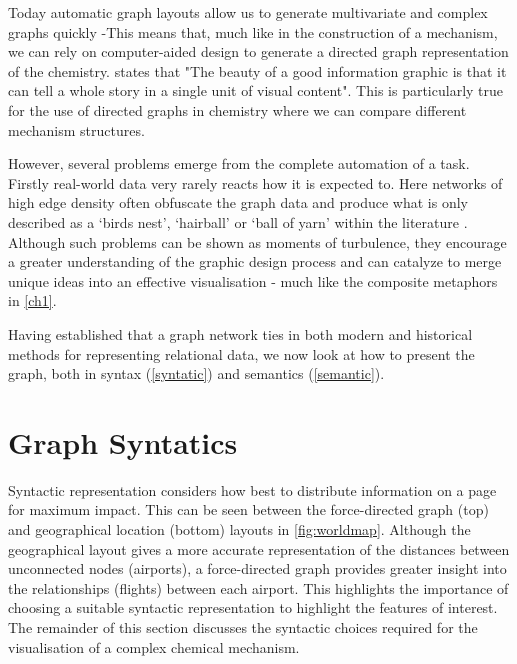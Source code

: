 Today automatic graph layouts allow us to generate multivariate and complex graphs quickly \citep{ch3} -This means that, much like in the construction of a mechanism, we can rely on computer-aided design to generate a directed graph representation of the chemistry. \cite{sciamerican} states that "The beauty of a good information graphic is that it can tell a whole story in a single unit of visual content". This is particularly true for the use of directed graphs in chemistry where we can compare different mechanism structures.

However, several problems emerge from the complete automation of a task. Firstly real-world data very rarely reacts how it is expected to. Here networks of high edge density often obfuscate the graph data and produce what is only described as a `birds nest', `hairball' or `ball of yarn' within the literature \citep{ch7}. Although such problems can be shown as moments of turbulence, they encourage a greater understanding of the graphic design process and can catalyze to merge unique ideas into an effective visualisation \citep{goodideas} - much like the composite metaphors in \autoref{ch1}.


Having established that a graph network ties in both modern and historical methods for representing relational data, we now look at how to present the graph, both in syntax (\autoref{syntatic}) and semantics (\autoref{semantic}).



\section{Graph Syntatics}\label{syntatic}

 Syntactic representation considers how best to distribute information on a page for maximum impact. This can be seen between the force-directed graph (top) and geographical location (bottom) layouts in \autoref{fig:worldmap}. Although the geographical layout gives a more accurate representation of the distances between unconnected nodes (airports), a force-directed graph provides greater insight into the relationships (flights) between each airport. This highlights the importance of choosing a suitable syntactic representation to highlight the features of interest. The remainder of this section discusses the syntactic choices required for the visualisation of a complex chemical mechanism.


